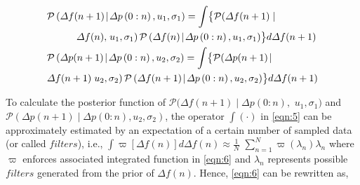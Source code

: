 \documentclass[lettersize,journal]{IEEEtran}
\newenvironment{newsubequations}{\small\begin{subequations}}{\end{subequations}}
\begin{document}
\vspace{-0.125in}
\begin{newsubequations}\label{eqn:6}
	\begin{align}
		 & \mathcal{P}\left(\varDelta f(n+1) \!\mid\! \varDelta p\left(0: n\right), u_{1}, \sigma_{1}\right)= \int \bigl\{\mathcal{P}(\varDelta f(n+1) \mid \bigr. \label{eqn:6a}                              \\
		 & \qquad\quad \bigl. \varDelta f(n), \left.u_{1}, \sigma_{1}\right) \mathcal{P}\left(\varDelta f(n) \!\mid\!  \varDelta p\left(0: n\right), u_{1}, \sigma_{1}\right)\bigr\} d \varDelta f(n+1) \notag \\
		 & \mathcal{P}\left(\varDelta p(n+1) \!\mid\!  \varDelta p\left(0: n\right), u_{2}, \sigma_{2}\right)=  \int \bigl\{\mathcal{P}(\varDelta p(n+1)\!\mid\! \bigr. \label{eqn:6b}                         \\
		 & \bigl. \varDelta f(n+1)\left.u_{2}, \sigma_{2}\right) \mathcal{P}\left(\varDelta f(n+1) \!\mid\!  \varDelta p\left(0: n\right), u_{2}, \sigma_{2}\right) \bigr\}d \varDelta f(n+1)\notag
	\end{align}
\end{newsubequations}

To calculate the posterior function of $\mathcal{P}(\varDelta f(n\!+\!1) \! \mid\! \varDelta p(0 \!:\! n),$ $ u_{1}, \sigma_{1})$ and $\mathcal{P}(\varDelta p(n\!+\!1) \!\mid\! \varDelta p(0\!:\!n), u_{2}, \sigma_{2})$, the operator $\!\!\int(\cdot)\!\!$  in \eqref{eqn:5} can be approximately estimated by an expectation of a certain number of sampled data (or called $filters$), i.e., $\int\varpi[\varDelta f(n)] d\varDelta f(n) \!\approx\! \frac{1}{N}$ $ \sum_{n=1}^{N} \varpi\left(\lambda_{n}\right) \lambda_{n}$ where $\varpi$ enforces associated integrated function in \eqref{eqn:6} and $\lambda_{n}$ represents possible $filters$ generated from the prior of $\varDelta f(n)$. Hence, \eqref{eqn:6} can be rewritten as,
\end{document}
